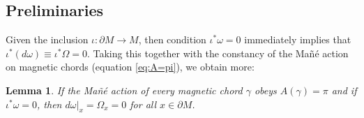 \documentclass[12pt]{amsart}
\numberwithin{equation}{section}
\newtheorem{lemma}[theorem]{Lemma}
\begin{document}
\subsection{Preliminaries}\label{section4.3}
Given the inclusion $\iota:\partial M\to M$, then condition $\iota^*\omega=0$ immediately implies that $\iota^{*}(d\omega)\equiv \iota^{*}\Omega=0$. Taking this together with the constancy of the Ma\~n\'e action on magnetic chords (equation \eqref{eq:A=pi}), we obtain more:

\begin{lemma} \label{lemma4.5}
If the Ma\~n\'e action of every magnetic chord $\gamma$ obeys $A(\gamma)=\pi$ and if $\iota^*\omega=0$, then $d\omega\vert_x=\Omega_{x}=0$ for all $x\in\partial M$.\label{lemma:Y=0}
\end{lemma}
\end{document}
